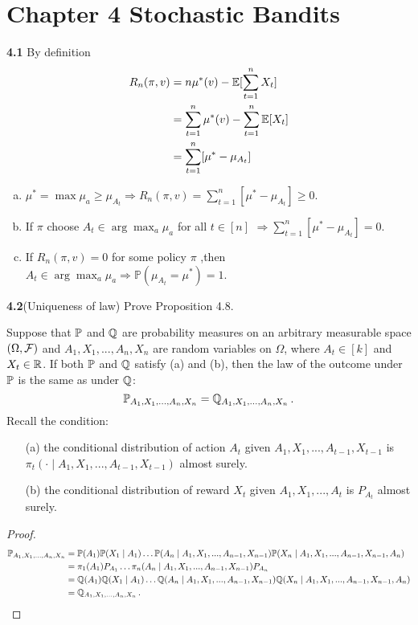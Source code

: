 \chapter*{Chapter 4 Stochastic Bandits}
\label{sec:second}

\noindent\textbf{4.1}
By definition
\begin{align}
R_n(\pi,v) &=n\mu^*(v)-\mathbb{E}[\sum^n_{t=1}X_t]\notag\\
&=\sum^n_{t=1}\mu^*(v)-\sum^n_{t=1}\mathbb{E}[X_t]\notag\\
&=\sum^n_{t=1}[\mu^*-\mu_{A_t}]\notag
\end{align}
\begin{enumerate}[(a)]
    \item $\mu^*=\max\mu_a\ge\mu_{A_t} \Rightarrow R_n(\pi,v)=\sum^n_{t=1}[\mu^*-\mu_{A_t}]\ge0$.

    \item If $\pi$ choose $A_t \in \arg\max_a\mu_a$ for all $t\in[n]$ $\Rightarrow \sum^n_{t=1}[\mu^*-\mu_{A_t}]=0$.

\item If $R_n(\pi,v)=0$ for some policy $\pi$ ,then $A_t \in \arg\max_a\mu_a \Rightarrow \mathbb{P}(\mu_{A_t}=\mu^*)=1$.
\end{enumerate}



\noindent\textbf{4.2}(Uniqueness of law) Prove Proposition 4.8. 
\begin{proposition}
Suppose that $\mathbb{P}$ and $\mathbb{Q}$ are probability measures on an arbitrary measurable space $(\Omega,\mathcal{F})$ and $A_1,X_1,...,A_n,X_n$ are random variables on $\Omega$, where $A_t\in [k]$ and $X_t\in\mathbb{R}$. If both $\mathbb{P}$ and $\mathbb{Q}$ satisfy (a) and (b), then the law of the outcome under $\mathbb{P}$ is the same as under $\mathbb{Q}$: 
$$\mathbb{P}_{A_1,X_1,...,A_n,X_n}=\mathbb{Q}_{A_1,X_1,...,A_n,X_n}\,.$$
Recall the condition:
\begin{enumerate}
    \item[(a)] the conditional distribution of action $A_t$ given $A_1,X_1,...,A_{t-1},X_{t-1}$ is $\pi_t(\cdot \mid A_1,X_1,...,A_{t-1},X_{t-1})$ almost surely.
    \item[(b)] the conditional distribution of reward $X_t$ given $A_1,X_1,...,A_{t}$ is $P_{A_t}$ almost surely.
\end{enumerate}
\end{proposition}

\begin{proof}
    \begin{align*}
        \mathbb{P}_{A_1,X_1,...,A_n,X_n} &= \mathbb{P}(A_1) \mathbb{P}(X_1\mid A_1)\ldots \mathbb{P}(A_n \mid A_1,X_1,...,A_{n-1},X_{n-1}) \mathbb{P}(X_n \mid A_1,X_1,...,A_{n-1},X_{n-1},A_n) \\
        &= \pi_1(A_1) P_{A_1}\ldots \pi_n(A_n\mid A_1,X_1,...,A_{n-1},X_{n-1} ) P_{A_n}\\
        &= \mathbb{Q}(A_1) \mathbb{Q}(X_1\mid A_1)\ldots \mathbb{Q}(A_n \mid A_1,X_1,...,A_{n-1},X_{n-1}) \mathbb{Q}(X_n \mid A_1,X_1,...,A_{n-1},X_{n-1},A_n)\\
        &= \mathbb{Q}_{A_1,X_1,...,A_n,X_n} \,.
    \end{align*}
\end{proof}
    





